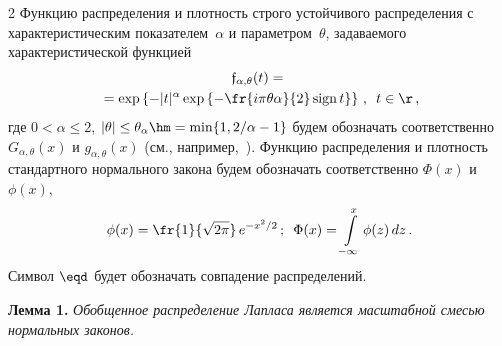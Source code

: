 \begin{multicols}{2}
Функцию распределения и плотность строго устойчивого распределения с
характеристическим показателем~$\alpha$ и параметром~$\theta$,
задаваемого характеристической функцией
\begin{multline}
\mathfrak{f}_{\alpha,\theta}(t)={}\\
{}=\exp\left\{-|t|^{\alpha}\exp\left\{
-\fr{i\pi\theta\alpha}{2}\,\mathrm{sign}\,t\right\}\right\}\,,\enskip 
t\in\r\,,\label{e2-kor}
\end{multline}
где $0<\alpha\le2$,
$|\theta|\le\theta_{\alpha}\hm=\min\{1,{2}/{\alpha}-1\}$ будем
обозначать соответственно $G_{\alpha,\theta}(x)$ и
$g_{\alpha,\theta}(x)$ (см., например,~\cite{Zolotarev1983}).
Функцию распределения и плотность стандартного нормального закона
будем обозначать соответственно $\Phi(x)$ и~$\phi(x)$,
$$
\phi(x)=\fr{1}{\sqrt{2\pi}}\,e^{-x^2/2}\,;\enskip
\Phi(x)=\int\limits_{-\infty}^x\phi(z)\,dz\,.
$$
Символ $\eqd$ будет обозначать совпадение распределений.

\smallskip

\noindent
\textbf{Лемма 1.} \textit{Обобщенное распределение Лапласа является
масштабной смесью нормальных законов.}

\smallskip


\end{multicols}
